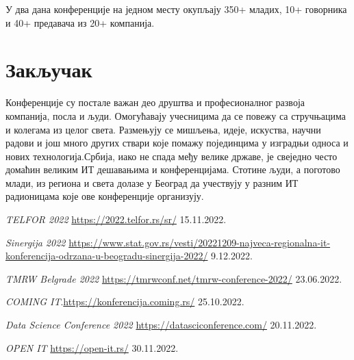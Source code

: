 \documentclass[12pt]{article}
\begin{document}
У два дана конференције на једном месту окупљају 350+ младих, 10+ говорника и 40+ предавача из 20+ компанија.\cite{openit}

\section{Закључак}
Конференције су постале важан део друштва и професионалног развоја компанија, посла и људи. Омогућавају учесницима да се повежу са стручњацима и колегама из целог света. Размењују се мишљења, идеје, искуства, научни радови и још много других ствари које помажу појединцима у изградњи односа и нових технологија.Србија, иако не спада међу велике државе, је свеједно често домаћин великим ИТ дешавањима и конференцијама. Стотине људи, а поготово млади, из региона и света долазе у Београд да учествују у разним ИТ радионицама које ове конференције организују.

\pagebreak

\appendix

\begin{thebibliography}{9}
 \emph{TELFOR 2022} \url{https://2022.telfor.rs/sr/} 15.11.2022.

 \emph{Sinergija 2022} \url{https://www.stat.gov.rs/vesti/20221209-najveca-regionalna-it-konferencija-odrzana-u-beogradu-sinergija-2022/} 9.12.2022.

 \emph{TMRW Belgrade 2022} \url{https://tmrwconf.net/tmrw-conference-2022/} 23.06.2022.

 \emph{COMING IT}.\url{https://konferencija.coming.rs/} 25.10.2022.


 \emph{Data Science Conference 2022} \url{https://datasciconference.com/} 20.11.2022.

 \emph{OPEN IT} \url{https://open-it.rs/} 30.11.2022.

\end{thebibliography}

\appendix
\end{document}
